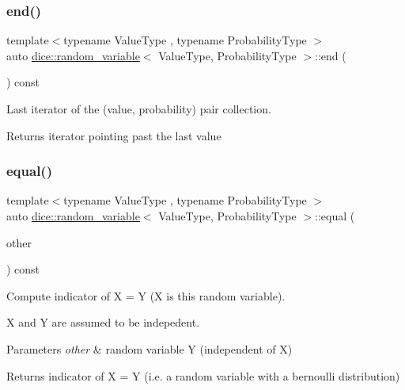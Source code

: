 \subsubsection{\texorpdfstring{end()}{end()}}
{\footnotesize\ttfamily template$<$typename Value\+Type , typename Probability\+Type $>$ \\
auto \mbox{\hyperlink{classdice_1_1random__variable}{dice\+::random\+\_\+variable}}$<$ Value\+Type, Probability\+Type $>$\+::end (\begin{DoxyParamCaption}{ }\end{DoxyParamCaption}) const\hspace{0.3cm}{\ttfamily [inline]}}



Last iterator of the (value, probability) pair collection. 

\begin{DoxyReturn}{Returns}
iterator pointing past the last value 
\end{DoxyReturn}
\mbox{\label{classdice_1_1random__variable_ac66bb2ec2b0d9a67029a3a9381d02d61}} 
\subsubsection{\texorpdfstring{equal()}{equal()}}
{\footnotesize\ttfamily template$<$typename Value\+Type , typename Probability\+Type $>$ \\
auto \mbox{\hyperlink{classdice_1_1random__variable}{dice\+::random\+\_\+variable}}$<$ Value\+Type, Probability\+Type $>$\+::equal (\begin{DoxyParamCaption}\item[{const \mbox{\hyperlink{classdice_1_1random__variable}{random\+\_\+variable}}$<$ Value\+Type, Probability\+Type $>$ \&}]{other }\end{DoxyParamCaption}) const\hspace{0.3cm}{\ttfamily [inline]}}



Compute indicator of X = Y (X is this random variable). 

X and Y are assumed to be indepedent.


\begin{DoxyParams}{Parameters}
{\em other} & random variable Y (independent of X)\\
\hline
\end{DoxyParams}
\begin{DoxyReturn}{Returns}
indicator of X = Y (i.\+e. a random variable with a bernoulli distribution) 
\end{DoxyReturn}
\mbox{\label{classdice_1_1random__variable_a210faa1d7ac3aa393804d87f828ca91c}} 
